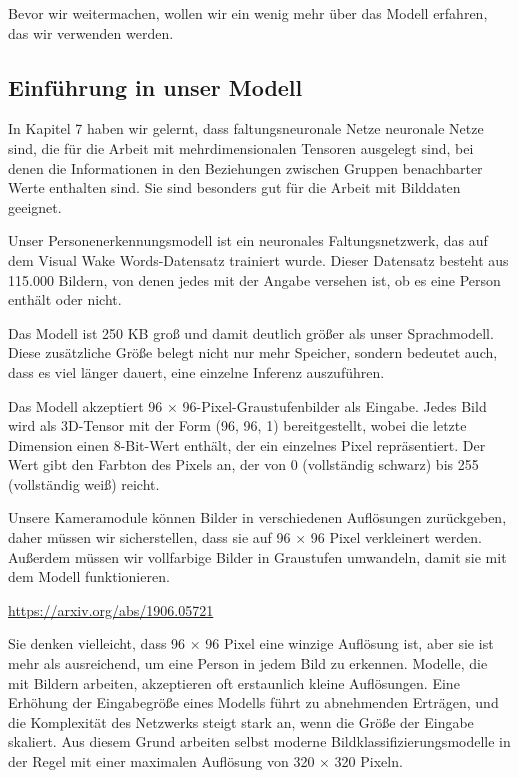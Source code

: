Bevor wir weitermachen, wollen wir ein wenig mehr über das Modell erfahren, das wir verwenden werden.

\subsection{Einführung in unser Modell}

In Kapitel 7 haben wir gelernt, dass faltungsneuronale Netze neuronale Netze sind, die für die Arbeit mit mehrdimensionalen Tensoren ausgelegt sind, bei denen die Informationen in den Beziehungen zwischen Gruppen benachbarter Werte enthalten sind. Sie sind besonders gut für die Arbeit mit Bilddaten geeignet.

Unser Personenerkennungsmodell ist ein neuronales Faltungsnetzwerk, das auf dem Visual Wake Words-Datensatz trainiert wurde. Dieser Datensatz besteht aus 115.000 Bildern, von denen jedes mit der Angabe versehen ist, ob es eine Person enthält oder nicht.

Das Modell ist 250 KB groß und damit deutlich größer als unser Sprachmodell. Diese zusätzliche Größe belegt nicht nur mehr Speicher, sondern bedeutet auch, dass es viel länger dauert, eine einzelne Inferenz auszuführen.

Das Modell akzeptiert 96 × 96-Pixel-Graustufenbilder als Eingabe. Jedes Bild wird als 3D-Tensor mit der Form (96, 96, 1) bereitgestellt, wobei die letzte Dimension einen 8-Bit-Wert enthält, der ein einzelnes Pixel repräsentiert. Der Wert gibt den Farbton des Pixels an, der von 0 (vollständig schwarz) bis 255 (vollständig weiß) reicht.

Unsere Kameramodule können Bilder in verschiedenen Auflösungen zurückgeben, daher müssen wir sicherstellen, dass sie auf 96 × 96 Pixel verkleinert werden. Außerdem müssen wir vollfarbige Bilder in Graustufen umwandeln, damit sie mit dem Modell funktionieren.

\url{https://arxiv.org/abs/1906.05721}


Sie denken vielleicht, dass 96 × 96 Pixel eine winzige Auflösung ist, aber sie ist mehr als ausreichend, um eine Person in jedem Bild zu erkennen. Modelle, die mit Bildern arbeiten, akzeptieren oft erstaunlich kleine Auflösungen. Eine Erhöhung der Eingabegröße eines Modells führt zu abnehmenden Erträgen, und die Komplexität des Netzwerks steigt stark an, wenn die Größe der Eingabe skaliert. Aus diesem Grund arbeiten selbst moderne Bildklassifizierungsmodelle in der Regel mit einer maximalen Auflösung von 320 × 320 Pixeln.

